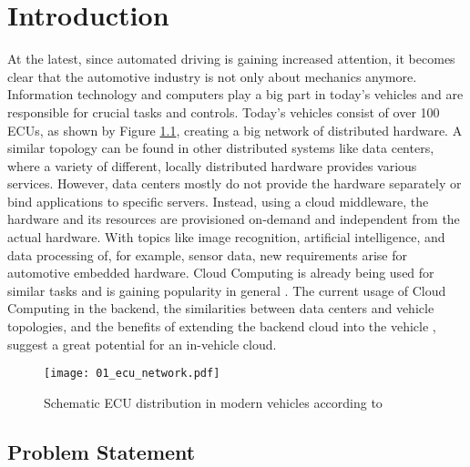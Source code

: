 \chapter{Introduction}
\label{chapter:introduction}
    
    At the latest, since automated driving is gaining increased attention, it becomes clear that the automotive industry is not only about mechanics anymore.
    Information technology and computers play a big part in today's vehicles and are responsible for crucial tasks and controls.
    Today's vehicles consist of over 100 \acp{ECU}, as shown by Figure \ref{fig:ecu_network}, creating a big network of distributed hardware.
    A similar topology can be found in other distributed systems like data centers, where a variety of different, locally distributed hardware provides various services.
    However, data centers mostly do not provide the hardware separately or bind applications to specific servers.
    Instead, using a cloud middleware, the hardware and its resources are provisioned on-demand and independent from the actual hardware.
    With topics like image recognition, artificial intelligence, and data processing of, for example, sensor data, new requirements arise for automotive embedded hardware.
    Cloud Computing is already being used for similar tasks and is gaining popularity in general \cite{Holst2020, KPMG2020}.
    The current usage of Cloud Computing in the backend, the similarities between data centers and vehicle topologies, and the benefits of extending the backend cloud into the vehicle \cite{Weber2020}, suggest a great potential for an in-vehicle cloud.

    \vfill
    \begin{figure}[ht]
        \begin{center}
            \texttt{[image: 01\_ecu\_network.pdf]}
            \caption[Schematic ECU distribution in modern vehicles]{Schematic ECU distribution in modern vehicles according to \cite{Bosch2020,Drawingdatabase2020}}
            \label{fig:ecu_network}
        \end{center}
    \end{figure}
    \vfill
   
    
    \section{Problem Statement}
    \label{section:problem}
    
